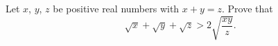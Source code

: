 Let $x$, $y$, $z$ be positive real numbers with $x+y=z$. Prove that
\[\sqrt x+\sqrt y+\sqrt z>2\sqrt{\dfrac{xy}{z}} .\]
